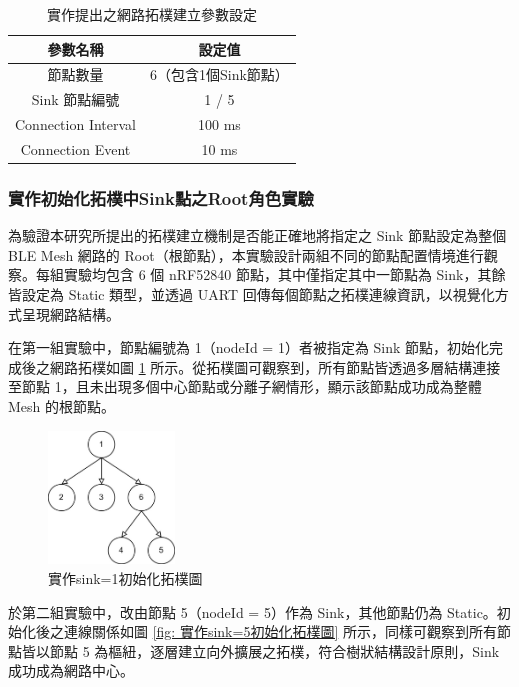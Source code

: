 \begin{ZhChapter}
\begin{table}[H]
    \centering
    \caption{實作提出之網路拓樸建立參數設定}
    \label{tab: 實作提出之網路拓樸建立參數設定}
    \begin{tabular}{|c|c|}
        \hline
        參數名稱 & 設定值 \\
        \hline
        節點數量 & 6（包含1個Sink節點） \\
        \hline
        Sink 節點編號 & 1 / 5 \\
        \hline
        Connection Interval & 100 ms \\
        \hline
        Connection Event & 10 ms \\
        \hline
    \end{tabular}
\end{table}

\subsubsection{實作初始化拓樸中Sink點之Root角色實驗}
為驗證本研究所提出的拓樸建立機制是否能正確地將指定之 Sink 節點設定為整個 BLE Mesh 網路的 Root（根節點），本實驗設計兩組不同的節點配置情境進行觀察。每組實驗均包含 6 個 nRF52840 節點，其中僅指定其中一節點為 Sink，其餘皆設定為 Static 類型，並透過 UART 回傳每個節點之拓樸連線資訊，以視覺化方式呈現網路結構。

在第一組實驗中，節點編號為 1（nodeId = 1）者被指定為 Sink 節點，初始化完成後之網路拓樸如圖 \ref{fig: 實作sink=1初始化拓樸圖} 所示。從拓樸圖可觀察到，所有節點皆透過多層結構連接至節點 1，且未出現多個中心節點或分離子網情形，顯示該節點成功成為整體 Mesh 的根節點。

\begin{figure}[H]
    \centering
    \includegraphics[width = 0.3\textwidth]{image/實作sink=1初始化拓樸圖.jpg}
    \caption{實作sink=1初始化拓樸圖}
    \label{fig: 實作sink=1初始化拓樸圖}
\end{figure}

於第二組實驗中，改由節點 5（nodeId = 5）作為 Sink，其他節點仍為 Static。初始化後之連線關係如圖 \ref{fig: 實作sink=5初始化拓樸圖} 所示，同樣可觀察到所有節點皆以節點 5 為樞紐，逐層建立向外擴展之拓樸，符合樹狀結構設計原則，Sink 成功成為網路中心。


\end{ZhChapter}
